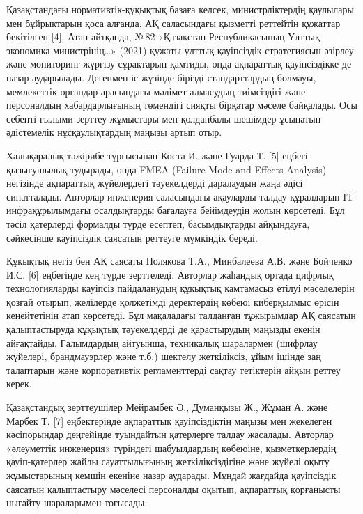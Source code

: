 Қазақстандағы нормативтік-құқықтық базаға келсек, министрліктердің
қаулылары мен бұйрықтарын қоса алғанда, АҚ саласындағы қызметті
реттейтін құжаттар бекітілген {[}4{]}. Атап айтқанда, №\,82 «Қазақстан
Республикасының Ұлттық экономика министрінің\ldots» (2021) құжаты ұлттық
қауіпсіздік стратегиясын әзірлеу және мониторинг жүргізу сұрақтарын
қамтиды, онда ақпараттық қауіпсіздікке де назар аударылады. Дегенмен іс
жүзінде бірізді стандарттардың болмауы, мемлекеттік органдар арасындағы
мәлімет алмасудың тиімсіздігі және персоналдың хабардарлығының төмендігі
сияқты бірқатар мәселе байқалады. Осы себепті ғылыми-зерттеу жұмыстары
мен қолданбалы шешімдер ұсынатын әдістемелік нұсқаулықтардың маңызы
артып отыр.

Халықаралық тәжірибе тұрғысынан Коста И. және Гуарда Т. {[}5{]} еңбегі
қызығушылық тудырады, онда FMEA (Failure Mode and Effects Analysis)
негізінде ақпараттық жүйелердегі тәуекелдерді даралаудың жаңа әдісі
сипатталады. Авторлар инженерия саласындағы ақауларды талдау құралдарын
IT-инфрақұрылымдағы осалдықтарды бағалауға бейімдеудің жолын көрсетеді.
Бұл тәсіл қатерлерді формалды түрде есептеп, басымдықтарды айқындауға,
сәйкесінше қауіпсіздік саясатын реттеуге мүмкіндік береді.

Құқықтық негіз бен АҚ саясаты Полякова Т.А., Минбалеева А.В. және
Бойченко И.С. {[}6{]} еңбегінде кең түрде зерттеледі. Авторлар жаһандық
ортада цифрлық технологияларды қауіпсіз пайдаланудың құқықтық қамтамасыз
етілуі мәселелерін қозғай отырып, желілерде қолжетімді деректердің
көбеюі киберқылмыс өрісін кеңейтетінін атап көрсетеді. Бұл мақаладағы
талданған тұжырымдар АҚ саясатын қалыптастыруда құқықтық тәуекелдерді де
қарастырудың маңызды екенін айғақтайды. Ғалымдардың айтуынша, техникалық
шаралармен (шифрлау жүйелері, брандмауэрлер және т.б.) шектелу
жеткіліксіз, ұйым ішінде заң талаптарын және корпоративтік
регламенттерді сақтау тетіктерін айқын реттеу керек.

Қазақстандық зерттеушілер Мейрамбек Ә., Думанқызы Ж., Жұман А. және
Марбек Т. {[}7{]} еңбектерінде ақпараттық қауіпсіздіктің маңызы мен
жекелеген кәсіпорындар деңгейінде туындайтын қатерлерге талдау жасалады.
Авторлар «әлеуметтік инженерия» түріндегі шабуылдардың көбеюіне,
қызметкерлердің қауіп-қатерлер жайлы сауаттылығының жеткіліксіздігіне
және жүйелі оқыту жұмыстарының кемшін екеніне назар аударады. Мұндай
жағдайда қауіпсіздік саясатын қалыптастыру мәселесі персоналды оқытып,
ақпараттық қорғанысты нығайту шараларымен тоғысады.

